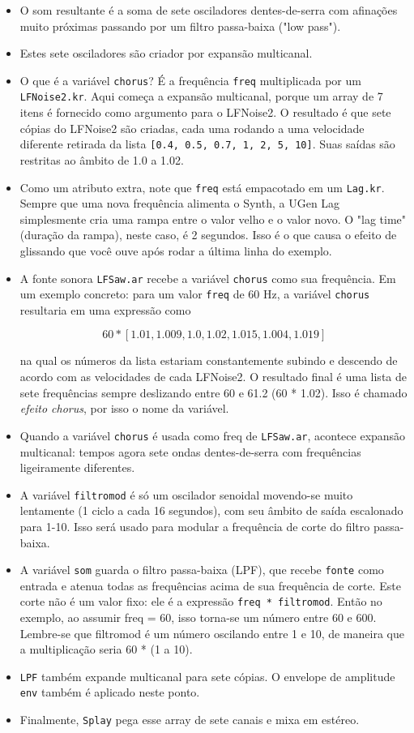 \begin{itemize}
\item O som resultante é a soma de sete osciladores dentes-de-serra com afinações muito próximas passando por um filtro passa-baixa ("low pass").
\item Estes sete osciladores são criador por expansão multicanal.
\item O que é a variável \texttt{chorus}? É a frequência \texttt{freq} multiplicada por um \texttt{LFNoise2.kr}. Aqui começa a expansão multicanal, porque um array de 7 itens é fornecido como argumento para o LFNoise2. O resultado é que sete cópias do LFNoise2 são criadas, cada uma rodando a uma velocidade diferente retirada da lista \texttt{[0.4, 0.5, 0.7, 1, 2, 5, 10]}. Suas saídas são restritas ao âmbito de 1.0 a 1.02.
\item Como um atributo extra, note que \texttt{freq} está empacotado em um \texttt{Lag.kr}. Sempre que uma nova frequência alimenta o Synth, a UGen Lag simplesmente cria uma rampa entre o valor velho e o valor novo. O "lag time" (duração da rampa), neste caso, é 2 segundos. Isso é o que causa o efeito de glissando que você ouve após rodar a última linha do exemplo.  
\item A fonte sonora \texttt{LFSaw.ar} recebe a variável \texttt{chorus} como sua frequência. Em um exemplo concreto: para um valor \texttt{freq} de 60 Hz, a variável \texttt{chorus} resultaria em uma expressão como

$$60 * [1.01, 1.009, 1.0, 1.02, 1.015, 1.004, 1.019]$$

na qual os números da lista estariam constantemente subindo e descendo de acordo com as velocidades de cada LFNoise2. O resultado final é uma lista de sete frequências sempre deslizando entre 60 e 61.2 (60 * 1.02). Isso é chamado \textit{efeito chorus}, por isso o nome da variável. 
\item Quando a variável \texttt{chorus} é usada como freq de \texttt{LFSaw.ar}, acontece expansão multicanal: tempos agora sete ondas dentes-de-serra com frequências ligeiramente diferentes.
\item A variável \texttt{filtromod} é só um oscilador senoidal movendo-se muito lentamente (1 ciclo a cada 16 segundos), com seu âmbito de saída escalonado para 1-10. Isso será usado para modular a frequência de corte do filtro passa-baixa.
\item A variável \texttt{som} guarda o filtro passa-baixa (LPF), que recebe \texttt{fonte} como entrada e atenua todas as frequências acima de sua frequência de corte. Este corte não é um valor fixo: ele é a expressão \texttt{freq * filtromod}. Então no exemplo, ao assumir freq = 60, isso torna-se um número entre 60 e 600. Lembre-se que filtromod é um número oscilando entre 1 e 10, de maneira que a multiplicação seria 60 * (1 a 10).
\item \texttt{LPF} também expande multicanal para sete cópias. O envelope de amplitude \texttt{env} também é aplicado neste ponto.
\item Finalmente, \texttt{Splay} pega esse array de sete canais e mixa em estéreo.

\end{itemize}
 
